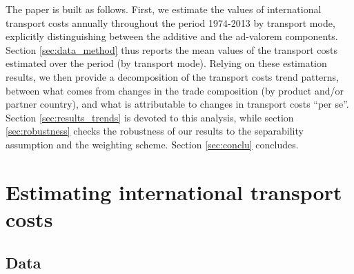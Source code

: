 \documentclass[a4paper,11pt]{article}
\begin{document}
The paper is built as follows.
First, we estimate the values of international transport costs annually throughout the period 1974-2013 by transport mode, explicitly distinguishing between the additive and the ad-valorem components.
 Section \ref{sec:data_method} thus reports the mean values of the transport costs estimated over the period (by transport mode).
Relying on these estimation results, we then provide a decomposition of the transport costs trend patterns, between what comes from changes in the trade composition (by product and/or partner country), and what is attributable to changes in transport costs ``per se''.
Section \ref{sec:results_trends} is devoted to this analysis, while section \ref{sec:robustness} checks the robustness of our results to the separability assumption and the weighting scheme.
Section \ref{sec:conclu} concludes.


\section{Estimating international transport costs\label{sec:data_method}}

\subsection{Data}
\end{document}
